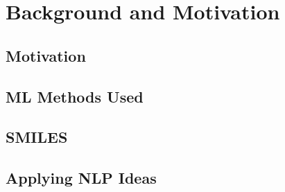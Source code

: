 \section{Background and Motivation \label{background}}
\subsection{Motivation}
\subsection{ML Methods Used}
\subsection{SMILES}
\subsection{Applying NLP Ideas}
